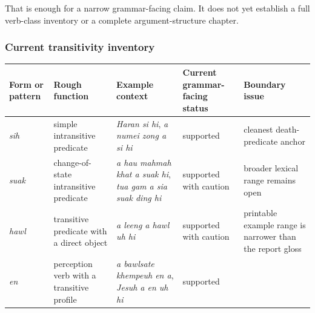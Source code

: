 \documentclass[
  11pt,
  a4paper,
]{article}
\newcounter{none} %
\newcommand{\tdim}[1]{\textit{#1}}
\begin{document}
That is enough for a narrow grammar-facing claim. It does not yet
establish a full verb-class inventory or a complete argument-structure
chapter.

\subsubsection{Current transitivity
inventory}\label{current-transitivity-inventory}

{\def\LTcaptype{none} %
\begin{longtable}[]{@{}
  >{\raggedright\arraybackslash}p{}
  >{\raggedright\arraybackslash}p{}
  >{\raggedright\arraybackslash}p{}
  >{\raggedright\arraybackslash}p{}
  >{\raggedright\arraybackslash}p{}@{}}
\toprule\noalign{}
\begin{minipage}[b]{\linewidth}\raggedright
Form or pattern
\end{minipage} & \begin{minipage}[b]{\linewidth}\raggedright
Rough function
\end{minipage} & \begin{minipage}[b]{\linewidth}\raggedright
Example context
\end{minipage} & \begin{minipage}[b]{\linewidth}\raggedright
Current grammar-facing status
\end{minipage} & \begin{minipage}[b]{\linewidth}\raggedright
Boundary issue
\end{minipage} \\
\midrule\noalign{}
\endhead
\bottomrule\noalign{}
\endlastfoot
\tdim{sih} & simple intransitive predicate & \tdim{Haran si hi},
\tdim{a numei zong a si hi} & supported & cleanest death-predicate
anchor \\
\tdim{suak} & change-of-state intransitive predicate &
\tdim{a hau mahmah khat a suak hi}, \tdim{tua gam a sia suak ding hi} &
supported with caution & broader lexical range remains open \\
\tdim{hawl} & transitive predicate with a direct object &
\tdim{a leeng a hawl uh hi} & supported with caution & printable example
range is narrower than the report gloss \\
\tdim{en} & perception verb with a transitive profile &
\tdim{a bawlsate khempeuh en a}, \tdim{Jesuh a en uh hi} & supported &

\end{longtable}}
\end{document}
